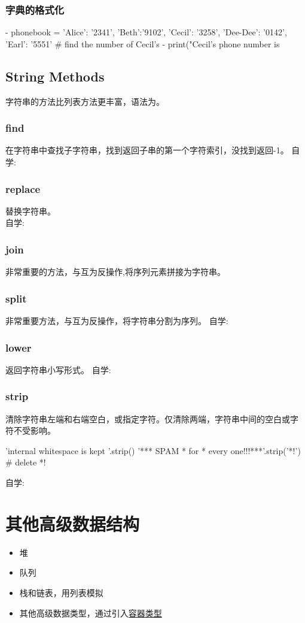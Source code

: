 \subsubsection{字典的格式化}
\begin{python}
- phonebook = {'Alice': '2341', 'Beth':'9102', 'Cecil': '3258',
  'Dee-Dee': '0142', 'Earl': '5551'}
# find the number of Cecil's
- print("Cecil's phone number is %
\end{python}
\subsection{String Methods}
字符串的方法比列表方法更丰富，语法为。
\subsubsection{find}
在字符串中查找子字符串，找到返回子串的第一个字符索引，没找到返回-1。
自学:
\subsubsection{replace}
替换字符串。
 \\
自学:
\subsubsection{join}
非常重要的方法，与互为反操作,将序列元素拼接为字符串。
\subsubsection{split}
非常重要方法，与互为反操作，将字符串分割为序列。
自学:
\subsubsection{lower}
返回字符串小写形式。
自学:
\subsubsection{strip}
清除字符串左端和右端空白，或指定字符。仅清除两端，字符串中间的空白或字
符不受影响。
\begin{python}
'internal whitespace is kept '.strip()
'*** SPAM * for * every one!!!***'.strip('*!') #  delete *!
\end{python}
自学:
\section{其他高级数据结构}
\begin{itemize}
\item 堆 
\item 队列 
\item 栈和链表，用列表模拟
\item 其他高级数据类型，通过引入\href{https://docs.python.org/3/library/collections.html?highlight=collections#module-collections}{容器类型}
\end{itemize}